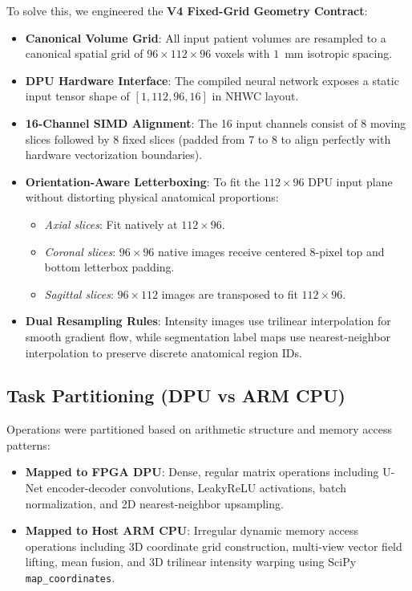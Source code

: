 \documentclass[conference]{IEEEtran}
\begin{document}
To solve this, we engineered the \textbf{V4 Fixed-Grid Geometry Contract}:
\begin{itemize}
    \item \textbf{Canonical Volume Grid}: All input patient volumes are resampled to a canonical spatial grid of $96 \times 112 \times 96$ voxels with $1$~mm isotropic spacing.
    \item \textbf{DPU Hardware Interface}: The compiled neural network exposes a static input tensor shape of $[1, 112, 96, 16]$ in NHWC layout.
    \item \textbf{16-Channel SIMD Alignment}: The 16 input channels consist of 8 moving slices followed by 8 fixed slices (padded from 7 to 8 to align perfectly with hardware vectorization boundaries).
    \item \textbf{Orientation-Aware Letterboxing}: To fit the $112 \times 96$ DPU input plane without distorting physical anatomical proportions:
    \begin{itemize}
        \item \textit{Axial slices}: Fit natively at $112 \times 96$.
        \item \textit{Coronal slices}: $96 \times 96$ native images receive centered 8-pixel top and bottom letterbox padding.
        \item \textit{Sagittal slices}: $96 \times 112$ images are transposed to fit $112 \times 96$.
    \end{itemize}
    \item \textbf{Dual Resampling Rules}: Intensity images use trilinear interpolation for smooth gradient flow, while segmentation label maps use nearest-neighbor interpolation to preserve discrete anatomical region IDs.
\end{itemize}

\subsection{Task Partitioning (DPU vs ARM CPU)}
Operations were partitioned based on arithmetic structure and memory access patterns:
\begin{itemize}
    \item \textbf{Mapped to FPGA DPU}: Dense, regular matrix operations including U-Net encoder-decoder convolutions, LeakyReLU activations, batch normalization, and 2D nearest-neighbor upsampling.
    \item \textbf{Mapped to Host ARM CPU}: Irregular dynamic memory access operations including 3D coordinate grid construction, multi-view vector field lifting, mean fusion, and 3D trilinear intensity warping using SciPy \texttt{map\_coordinates}.
\end{itemize}
\end{document}
